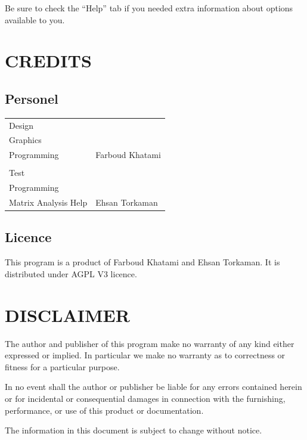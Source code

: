 \documentclass{article}
\begin{document}
Be sure to check the “Help” tab if you needed extra information about options available to you.
\section{CREDITS}
\subsection{Personel}
\begin{tabular}{ll}
Design\\
Graphics\\
Programming & Farboud Khatami\\
\\
Test\\
Programming\\
Matrix Analysis Help & Ehsan Torkaman\\
\end{tabular}

\subsection{Licence}
This program is	a product of Farboud Khatami and Ehsan Torkaman. It is distributed under AGPL V3 licence.

\section{DISCLAIMER}

The author and publisher of this program make no warranty of any
kind either expressed or implied. In particular we make no
warranty as to correctness or fitness for a particular purpose.

In no event shall the author or publisher be liable for any errors
contained herein or for incidental or consequential damages in
connection with the furnishing, performance, or use of this product
or documentation.

The information in this document is subject to change without
notice.
\end{document}
